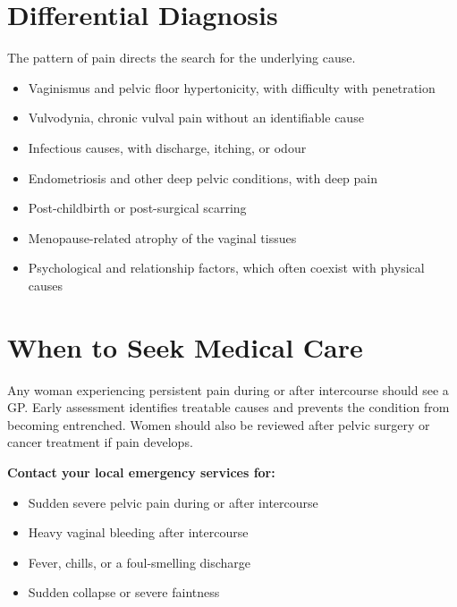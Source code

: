 \section*{Differential Diagnosis}
The pattern of pain directs the search for the underlying cause.
\begin{itemize}
    \item Vaginismus and pelvic floor hypertonicity, with difficulty with penetration
    \item Vulvodynia, chronic vulval pain without an identifiable cause
    \item Infectious causes, with discharge, itching, or odour
    \item Endometriosis and other deep pelvic conditions, with deep pain
    \item Post-childbirth or post-surgical scarring
    \item Menopause-related atrophy of the vaginal tissues
    \item Psychological and relationship factors, which often coexist with physical causes
\end{itemize}

\section*{When to Seek Medical Care}
Any woman experiencing persistent pain during or after intercourse should see a GP. Early assessment identifies treatable causes and prevents the condition from becoming entrenched. Women should also be reviewed after pelvic surgery or cancer treatment if pain develops.

\textbf{Contact your local emergency services for:}
\begin{itemize}
    \item Sudden severe pelvic pain during or after intercourse
    \item Heavy vaginal bleeding after intercourse
    \item Fever, chills, or a foul-smelling discharge
    \item Sudden collapse or severe faintness
\end{itemize}

